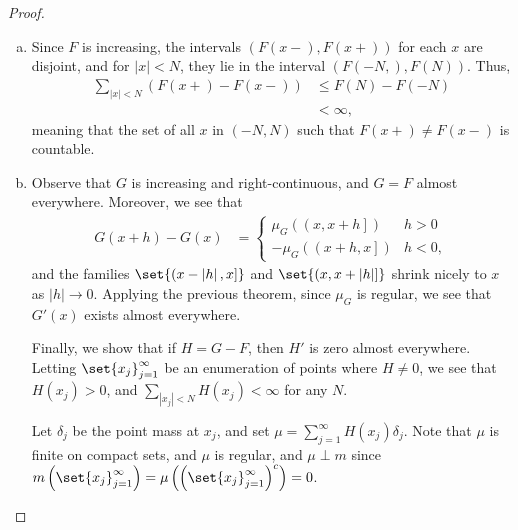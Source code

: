 \documentclass[10pt]{mypackage}
\begin{document}
  \begin{proof}\hfill
    \begin{enumerate}[(a)]
      \item Since $F$ is increasing, the intervals $\left( F\left( x- \right),F\left( x+ \right) \right)$ for each $x$ are disjoint, and for $\left\vert x \right\vert < N$, they lie in the interval $\left( F\left( -N, \right),F\left( N \right) \right)$. Thus,
        \begin{align*}
          \sum_{\left\vert x \right\vert < N} \left( F\left( x+ \right)-F\left( x- \right) \right) &\leq F\left( N \right) - F\left( -N \right)\\
                                                                                                   &< \infty,
        \end{align*}
        meaning that the set of all $x$ in $(-N,N)$ such that $F(x+) \neq F(x-)$ is countable.
      \item Observe that $G$ is increasing and right-continuous, and $G = F$ almost everywhere. Moreover, we see that
        \begin{align*}
          G\left( x+h \right) - G\left( x \right) &= \begin{cases}
            \mu_G\left( \left( x,x+h \right] \right) & h > 0\\
            -\mu_G\left( \left( x+h,x \right] \right) & h < 0,
          \end{cases}
        \end{align*}
        and the families $\set{\left( x-\left\vert h \right\vert,x \right]}$ and $\set{\left( x,x+\left\vert h \right\vert \right]}$ shrink nicely to $x$ as $\left\vert h \right\vert \rightarrow 0$. Applying the previous theorem, since $\mu_G$ is regular, we see that $G'(x)$ exists almost everywhere.\newline

        Finally, we show that if $H = G-F$, then $H'$ is zero almost everywhere. Letting $\set{x_j}_{j=1}^{\infty}$ be an enumeration of points where $H\neq 0$, we see that $H\left( x_j \right) > 0$, and $\sum_{\left\vert x_j \right\vert < N}H\left( x_j \right) < \infty$ for any $N$.\newline

        Let $\delta_j$ be the point mass at $x_j$, and set $\mu = \sum_{j=1}^{\infty}H\left( x_j \right)\delta_j$. Note that $\mu$ is finite on compact sets, and $\mu$ is regular, and $\mu\perp m$ since $m\left( \set{x_j}_{j=1}^{\infty} \right) = \mu\left( \left( \set{x_j}_{j=1}^{\infty} \right)^{c} \right) = 0$.\newline


\end{enumerate}
\end{proof}
\end{document}
